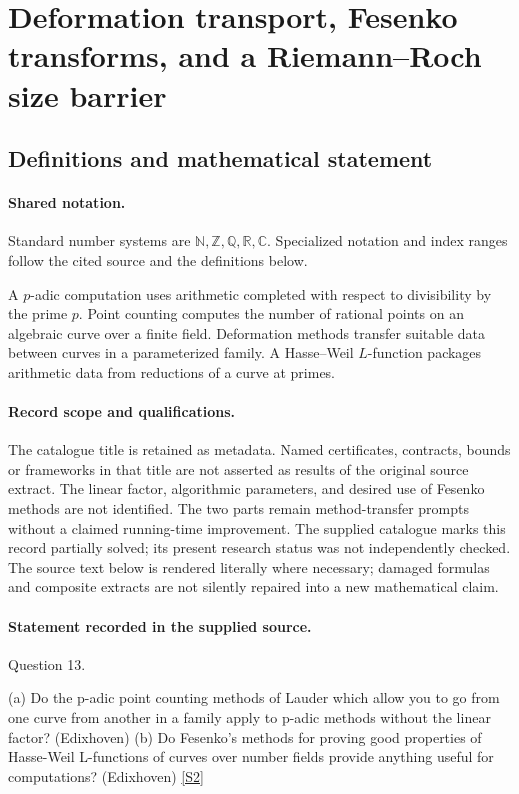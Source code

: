 \documentclass[11pt]{article}
\newcommand{\sref}[2]{\hyperlink{source:#1:#2}{[S#2]}}
\begin{document}
\section{Deformation transport, Fesenko transforms, and a Riemann--Roch size barrier}\label{statement}

\subsection{Definitions and mathematical statement}

\paragraph{Shared notation.}Standard number systems are $\mathbb N,\mathbb Z,\mathbb Q,\mathbb R,\mathbb C$. Specialized notation and index ranges follow the cited source and the definitions below.


A $p$-adic computation uses arithmetic completed with respect to divisibility by the prime $p$. Point counting computes the number of rational points on an algebraic curve over a finite field. Deformation methods transfer suitable data between curves in a parameterized family. A Hasse--Weil $L$-function packages arithmetic data from reductions of a curve at primes.
\paragraph{Record scope and qualifications.}
The catalogue title is retained as metadata. Named certificates, contracts, bounds or frameworks in that title are not asserted as results of the original source extract.
The linear factor, algorithmic parameters, and desired use of Fesenko methods are not identified. The two parts remain method-transfer prompts without a claimed running-time improvement. The supplied catalogue marks this record partially solved; its present research status was not independently checked.
The source text below is rendered literally where necessary; damaged formulas and composite extracts are not silently repaired into a new mathematical claim.
\paragraph{Statement recorded in the supplied source.}
Question 13.

(a) Do the p-adic point counting methods of Lauder which allow you to go from one curve from another in a family apply to p-adic methods without the linear factor? (Edixhoven) (b) Do Fesenko's methods for proving good properties of Hasse-Weil L-functions of curves over number fields provide anything useful for computations? (Edixhoven) \sref{statement}{2}
\end{document}
